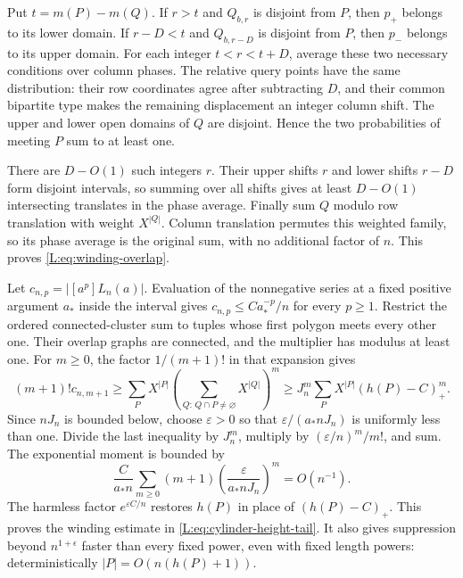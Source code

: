 Put $t=m(P)-m(Q)$. If $r>t$ and $Q_{b,r}$ is disjoint from $P$, then
$p_+$ belongs to its lower domain. If $r-D<t$ and $Q_{b,r-D}$ is
disjoint from $P$, then $p_-$ belongs to its upper domain. For each
integer $t<r<t+D$, average these two necessary conditions over column
phases. The relative query points have the same distribution: their
row coordinates agree after subtracting $D$, and their common bipartite
type makes the remaining displacement an integer column shift. The
upper and lower open domains of $Q$ are disjoint. Hence the two
probabilities of meeting $P$ sum to at least one.

There are $D-O(1)$ such integers $r$. Their upper shifts $r$ and lower
shifts $r-D$ form disjoint intervals, so summing over all shifts gives
at least $D-O(1)$ intersecting translates in the phase average. Finally
sum $Q$ modulo row translation with weight $X^{|Q|}$. Column translation
permutes this weighted family, so its phase average is the original
sum, with no additional factor of $n$. This proves
\eqref{L:eq:winding-overlap}.

Let $c_{n,p}=|[a^p]L_n(a)|$. Evaluation of the nonnegative series at a
fixed positive argument $a_*$ inside the interval gives
$c_{n,p}\le C a_*^{-p}/n$ for every $p\ge1$. Restrict the ordered
connected-cluster sum to tuples whose first polygon meets every other
one. Their overlap graphs are connected, and the multiplier has modulus
at least one. For $m\ge0$, the factor $1/(m+1)!$ in that expansion gives
\[
 (m+1)!c_{n,m+1}
 \ge\sum_PX^{|P|}
       \left(\sum_{Q:\,Q\cap P\ne\varnothing}X^{|Q|}\right)^m
 \ge J_n^m\sum_PX^{|P|}(h(P)-C)_+^m.
\]
Since $nJ_n$ is bounded below, choose $\varepsilon>0$ so that
$\varepsilon/(a_*nJ_n)$ is uniformly less than one. Divide the last
inequality by $J_n^m$, multiply by $(\varepsilon/n)^m/m!$, and sum.
The exponential moment is bounded by
\[
 \frac{C}{a_*n}\sum_{m\ge0}(m+1)
      \left(\frac{\varepsilon}{a_*nJ_n}\right)^m=O(n^{-1}).
\]
The harmless factor $e^{\varepsilon C/n}$ restores $h(P)$ in place of
$(h(P)-C)_+$. This proves the winding estimate in
\eqref{L:eq:cylinder-height-tail}. It also gives suppression beyond
$n^{1+\epsilon}$ faster than every fixed power, even with fixed length
powers: deterministically $|P|=O(n(h(P)+1))$.

